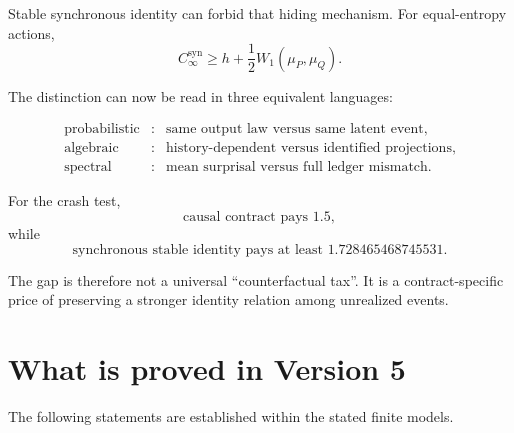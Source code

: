 \documentclass[11pt,a4paper]{article}
\newcommand{\CinfSyn}{C_{\infty}^{\mathrm{syn}}}
\newcommand{\1}{\mathbf 1}
\begin{document}
Stable synchronous identity can forbid that hiding mechanism.
For equal-entropy actions,
\[
\CinfSyn
\ge
h+\frac12W_1(\mu_P,\mu_Q).
\tag{41.2}
\]

The distinction can now be read in three equivalent languages:

\[
\boxed{
\begin{array}{ccl}
\text{probabilistic}
&:&
\text{same output law versus same latent event},
\\
\text{algebraic}
&:&
\text{history-dependent versus identified projections},
\\
\text{spectral}
&:&
\text{mean surprisal versus full ledger mismatch}.
\end{array}
}
\tag{41.3}
\]

For the crash test,
\[
\boxed{
\text{causal contract pays }1.5,
}
\]
while
\[
\boxed{
\text{synchronous stable identity pays at least }
1.728465468745531.
}
\]

The gap is therefore not a universal ``counterfactual tax''.
It is a contract-specific price of preserving a stronger identity
relation among unrealized events.


\section{What is proved in Version 5}

The following statements are established within the stated finite
models.
\end{document}
